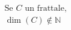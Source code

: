 \documentclass[preview]{standalone}
\begin{document}
\begin{align*}
\text{Se } C \text{ un frattale, } \\ \operatorname{dim}(C) \not \in \mathbb{N}
\end{align*}
\end{document}
